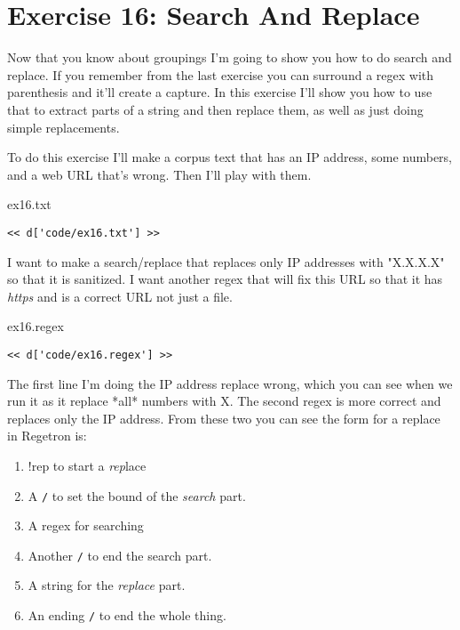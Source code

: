 \chapter{Exercise 16: Search And Replace}

Now that you know about groupings I'm going to show you how to do search and
replace.  If you remember from the last exercise you can surround a regex with
parenthesis and it'll create a capture.  In this exercise I'll show you how
to use that to extract parts of a string and then replace them, as well
as just doing simple replacements.

To do this exercise I'll make a corpus text that has an IP address, some
numbers, and a web URL that's wrong.  Then I'll play with them.

\begin{code}{ex16.txt}
\begin{Verbatim}
<< d['code/ex16.txt'] >>
\end{Verbatim}
\end{code}

I want to make a search/replace that replaces only IP addresses with
"X.X.X.X" so that it is sanitized.  I want another regex that will fix this
URL so that it has \emph{https} and is a correct URL not just a file.

\begin{code}{ex16.regex}
\begin{Verbatim}
<< d['code/ex16.regex'] >>
\end{Verbatim}
\end{code}

The first line I'm doing the IP address replace wrong, which you can see
when we run it as it replace *all* numbers with X.  The second regex is
more correct and replaces only the IP address.  From these two you can see
the form for a replace in Regetron is:

\begin{enumerate}
\item !rep to start a \emph{rep}lace
\item A \verb|/| to set the bound of the \emph{search} part.
\item A regex for searching
\item Another \verb|/| to end the search part.
\item A string for the \emph{replace} part.
\item An ending \verb|/| to end the whole thing.
\end{enumerate}

